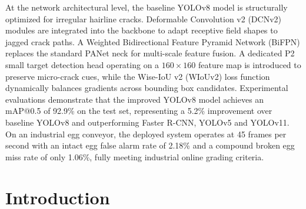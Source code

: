 \documentclass[12pt,a4paper]{report}
\begin{document}
At the network architectural level, the baseline YOLOv8 model is structurally optimized for irregular hairline cracks. Deformable Convolution v2 (DCNv2) modules are integrated into the backbone to adapt receptive field shapes to jagged crack paths. A Weighted Bidirectional Feature Pyramid Network (BiFPN) replaces the standard PANet neck for multi-scale feature fusion. A dedicated P2 small target detection head operating on a $160 \times 160$ feature map is introduced to preserve micro-crack cues, while the Wise-IoU v2 (WIoUv2) loss function dynamically balances gradients across bounding box candidates. Experimental evaluations demonstrate that the improved YOLOv8 model achieves an mAP@0.5 of 92.9\% on the test set, representing a 5.2\% improvement over baseline YOLOv8 and outperforming Faster R-CNN, YOLOv5 and YOLOv11. On an industrial egg conveyor, the deployed system operates at 45 frames per second with an intact egg false alarm rate of 2.18\% and a compound broken egg miss rate of only 1.06\%, fully meeting industrial online grading criteria.

\clearpage



\tableofcontents

\clearpage


\listoffigures

\clearpage


\listoftables

\clearpage



\chapter{Introduction}
\end{document}
